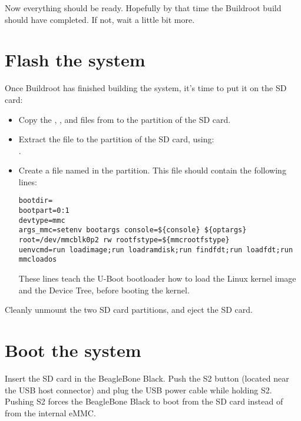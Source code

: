 Now everything should be ready. Hopefully by that time the Buildroot
build should have completed. If not, wait a little bit more.

\section{Flash the system}

Once Buildroot has finished building the system, it's time to put it
on the SD card:

\begin{itemize}

\item Copy the , ,  and
   files from  to the
   partition of the SD card.

\item Extract the  file to the 
  partition of the SD card, using:\\
  .

\item Create a file named  in the 
  partition. This file should contain the following lines:

{\small
\begin{verbatim}
bootdir=
bootpart=0:1
devtype=mmc
args_mmc=setenv bootargs console=${console} ${optargs} root=/dev/mmcblk0p2 rw rootfstype=${mmcrootfstype}
uenvcmd=run loadimage;run loadramdisk;run findfdt;run loadfdt;run mmcloados
\end{verbatim}
}

  These lines teach the U-Boot bootloader how to load the Linux kernel
  image and the Device Tree, before booting the kernel.

\end{itemize}

Cleanly unmount the two SD card partitions, and eject the SD card.

\section{Boot the system}

Insert the SD card in the BeagleBone Black. Push the S2 button
(located near the USB host connector) and plug the USB power cable
while holding S2. Pushing S2 forces the BeagleBone Black to boot from
the SD card instead of from the internal eMMC.

